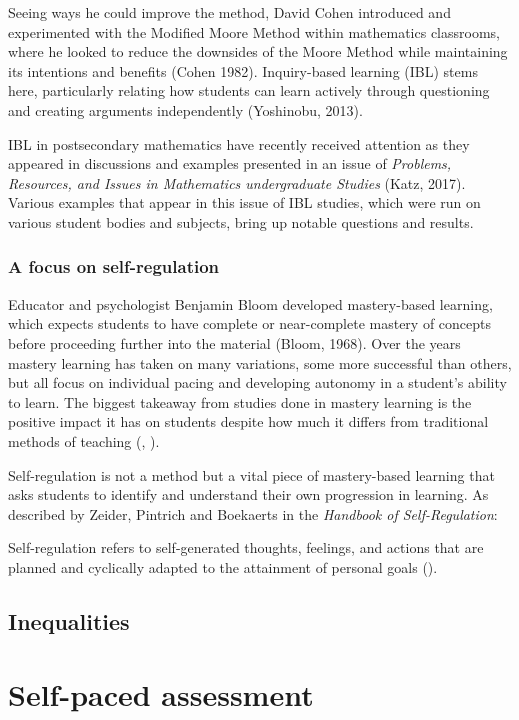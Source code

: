 Seeing ways he could improve the method, David Cohen introduced and experimented with the Modified Moore Method within mathematics classrooms, where he looked to reduce the downsides of the Moore Method while maintaining its intentions and benefits (Cohen 1982). Inquiry-based learning (IBL) stems here, particularly relating how students can learn actively through questioning and creating arguments independently (Yoshinobu, 2013).

IBL in postsecondary mathematics have recently received attention as they appeared in discussions and examples presented in an issue of {\it Problems, Resources, and Issues in Mathematics undergraduate Studies} (Katz, 2017). Various examples that appear in this issue of IBL studies, which were run on various student bodies and subjects, bring up notable questions and results.

\subsubsection{A focus on self-regulation}
Educator and psychologist Benjamin Bloom developed mastery-based learning, which expects students to have complete or near-complete mastery of concepts before proceeding further into the material (Bloom, 1968). Over the years mastery learning has taken on many variations, some more successful than others, but all focus on individual pacing and developing autonomy in a student's ability to learn. The biggest takeaway from studies done in mastery learning is the positive impact it has on students despite how much it differs from traditional methods of teaching (\cite{zollinger_impact_2017}, \cite{bradley_evaluating_2017}).

Self-regulation is not a method but a vital piece of mastery-based learning that asks students to identify and understand their own progression in learning. As described by Zeider, Pintrich and Boekaerts in the \emph{Handbook of Self-Regulation}:
\begin{displayquote}
  Self-regulation refers to self-generated thoughts, feelings, and actions that are planned and cyclically adapted to the attainment of personal goals (\cite{zeider}).
\end{displayquote}


\subsection{Inequalities}
\section{Self-paced assessment}
